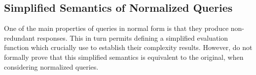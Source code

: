 

\subsection{Simplified Semantics of Normalized Queries}
\label{sec:simpl-semantics}

One of the main properties of queries in normal form is that they produce non-redundant responses.
This in turn permits defining a simplified evaluation function which \HP crucially use to establish their complexity results.
However, \HP do not formally prove that this simplified semantics is equivalent to the original, when considering normalized queries.

